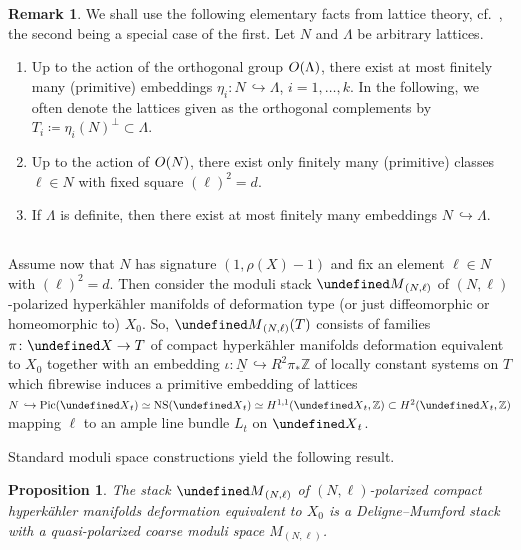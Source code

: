 \documentclass[11pt]{article}
\newtheorem{prop}[theo]{Proposition}
\theoremstyle{definition}
\newtheorem{rema}[theo]{Remark}
\numberwithin{equation}{section}
\numberwithin{figure}{section}
\numberwithin{table}{section}
\let\cal\undefined
\DeclareMathOperator{\NS}{NS}
\DeclareMathOperator{\Pic}{Pic}
\newcommand{\OO}{{\rm O}}
\newcommand{\cal}{\mathcal}
\newcommand{\km}{{\cal M}}
\newcommand{\kx}{{\cal X}}
\newcommand{\ZZ}{\mathbb{Z}}
\renewcommand{\cong}{\simeq}
\begin{document}
\begin{rema}\label{rem:Kneser}
We shall use the following elementary facts from lattice theory, cf.~\cite[Satz~30.2]{Kneser}, the second being a special case of the first. Let $N$ and $\Lambda$ be arbitrary lattices.
\begin{enumerate}
\item \label{1.1.1} Up to the action of the orthogonal group $\OO(\Lambda)$, there exist at most finitely many (primitive) embeddings $\eta_i\colon N\,\hookrightarrow \Lambda$, $i=1,\dots,k$. In the following, we often denote the lattices given as the orthogonal complements by $T_i\coloneqq \eta_i(N)^\perp\subset \Lambda$.
\item \label{1.1.2} Up to the action of $\OO(N)$, there exist only finitely many (primitive) classes $\ell\in N$ with fixed square $(\ell)^2=d$.
\item \label{1.1.3} If $\Lambda$ is definite, then there exist at most finitely many embeddings $N\,\hookrightarrow\Lambda$.
\end{enumerate}
\end{rema}

\subsection{}
Assume now that $N$ has signature $(1,\rho(X)-1)$ and fix an element $\ell\in N$ with $(\ell)^2=d$. Then consider the moduli stack $\km_{(N,\ell)}$ of $(N,\ell)$-polarized hyperk\"ahler manifolds of deformation type (or just diffeomorphic or homeomorphic to) $X_0$. So, $\km_{(N,\ell)}(T)$ consists of families $\pi\colon\kx\to T$ of compact hyperk\"ahler manifolds deformation equivalent to $X_0$ together with an embedding $\iota\colon\underline N\,\hookrightarrow R^2\pi_*\ZZ$ of locally constant systems on $T$ which fibrewise induces a primitive embedding of lattices $N\,\hookrightarrow \Pic(\kx_t)\cong\NS(\kx_t)\cong H^{1,1}(\kx_t,\ZZ)\subset H^2(\kx_t,\ZZ)$ mapping $\ell$ to an ample line bundle $L_t$ on $\kx_t$.

Standard moduli space constructions yield the following result.

\begin{prop}\label{prop:DMcoarse}
The stack $\km_{(N,\ell)}$ of $(N,\ell)$-polarized compact hyperk\"ahler manifolds deformation equivalent to $X_0$ is a Deligne--Mumford stack with a quasi-polarized coarse moduli space $M_{(N,\ell)}$.
\end{prop}
\end{document}
